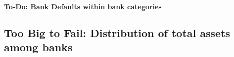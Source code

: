 \documentclass[12pt, a4paper]{article} %
\begin{document}
\textbf{To-Do: Bank Defaults within bank categories}

\fi

\newpage

\subsection{Too Big to Fail: Distribution of total assets among banks}
\label{sec:ToBigToFail}
\end{document}
